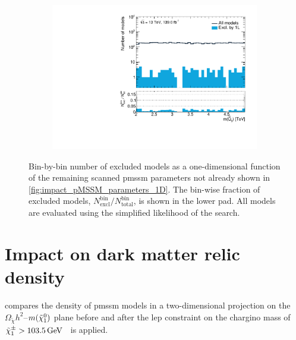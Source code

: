 \begin{figure}
\begin{subfigure}[b]{0.4\linewidth}
	\end{subfigure}
	\begin{subfigure}[b]{0.4\linewidth}
		\centering\includegraphics[width=\textwidth]{1D/mqL3}
	\end{subfigure}
	\caption{Bin-by-bin number of excluded models as a one-dimensional function of the remaining scanned \gls{pmssm} parameters not already shown in \cref{fig:impact_pMSSM_parameters_1D}. The bin-wise fraction of excluded models, $N^\mathrm{bin}_\mathrm{excl} / N^\mathrm{bin}_\mathrm{total}$, is shown in the lower pad. All models are evaluated using the simplified likelihood of the \onelepton search.}
	\label{fig:impact_pMSSM_parameters_1D_2}
\end{figure}


\FloatBarrier

\section{Impact on dark matter relic density}

 compares the density of \gls{pmssm} models in a two-dimensional projection on the $\Omega_{\tilde{\chi}} h^2$--$m(\tilde{\chi}_1^0)$ plane before and after the \gls{lep} constraint on the chargino mass of $\charg > \SI{103.5}{\GeV}$~\cite{lep_susy_results} is applied.

